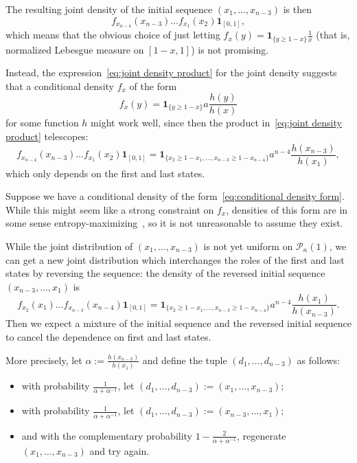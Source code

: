 \documentclass{article}
\theoremstyle{definition}
\newcommand{\one}{\mathbf{1}}
\begin{document}
The resulting joint density of the initial sequence $(x_1, \dots , x_{n-3})$ is then
\begin{equation}\label{eq:joint density product}
	f_{x_{n-4}}(x_{n-3}) \dots f_{x_1}(x_2) \one_{[0,1]},
\end{equation}
which means that the obvious choice of just letting $f_x(y) = \one_{\{y \geq 1-x\}} \frac{1}{x}$ (that is, normalized Lebesgue measure on $[1-x,1]$) is not promising.

Instead, the expression~\eqref{eq:joint density product} for the joint density suggests that a conditional density $f_x$ of the form
\begin{equation}\label{eq:conditional density form}
	f_x(y) = \one_{\{y \geq 1-x\}} a \frac{h(y)}{h(x)}
\end{equation}
for some function $h$ might work well, since then the product in~\eqref{eq:joint density product} telescopes:
\begin{equation}\label{eq:telescope1}
	f_{x_{n-4}}(x_{n-3}) \dots f_{x_1}(x_2) \one_{[0,1]} = \one_{\{x_2 \geq 1-x_1, \dots, x_{n-3} \geq 1-x_{n-4}\}} a^{n-4} \frac{h(x_{n-3})}{h(x_1)},
\end{equation}
which only depends on the first and last states.

Suppose we have a conditional density of the form~\eqref{eq:conditional density form}. While this might seem like a strong constraint on $f_x$, densities of this form are in some sense entropy-maximizing~\cite{bassetVolumetryTimedLanguages2013,bassetMaximalEntropyStochastic2015}, so it is not unreasonable to assume they exist.

While the joint distribution of $(x_1, \dots , x_{n-3})$ is not yet uniform on $\mathcal{P}_n(1)$, we can get a new joint distribution which interchanges the roles of the first and last states by reversing the sequence: the density of the reversed initial sequence $(x_{n-3}, \dots , x_1)$ is
\[
	f_{x_{2}}(x_1) \dots f_{x_{n-3}}(x_{n-4}) \one_{[0,1]} = \one_{\{x_2 \geq 1-x_1, \dots, x_{n-3} \geq 1-x_{n-4}\}} a^{n-4} \frac{h(x_1)}{h(x_{n-3})}.
\]
Then we expect a mixture of the initial sequence and the reversed initial sequence to cancel the dependence on first and last states.

More precisely, let $\alpha := \frac{h(x_{n-3})}{h(x_1)}$ and define the tuple $(d_1, \dots , d_{n-3})$ as follows: 
\begin{itemize}
	\item with probability $\frac{1}{\alpha + \alpha^{-1}}$, let $(d_1, \dots , d_{n-3}) := (x_1, \dots , x_{n-3})$; 
	\item with probability $\frac{1}{\alpha + \alpha^{-1}}$, let $(d_1, \dots , d_{n-3}) := (x_{n-3}, \dots , x_1)$;
	\item and with the complementary probability $1-\frac{2}{\alpha + \alpha^{-1}}$, regenerate $(x_1, \dots , x_{n-3})$ and try again. 
\end{itemize}
\end{document}
